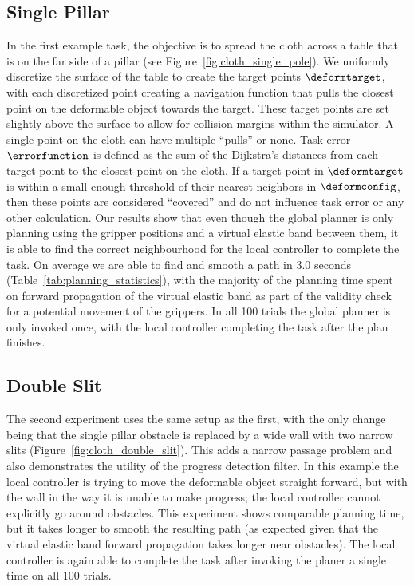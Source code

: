 \subsection{Single Pillar}
\label{sec:single_pillar}









In the first example task, the objective is to spread the cloth across a table that is on the far side  of a pillar (see Figure~\ref{fig:cloth_single_pole}). We uniformly discretize the surface of the table to create the target points $\deformtarget$, with each discretized point creating a navigation function that pulls the closest point on the deformable object towards the target. These target points are set slightly above the surface to allow for collision margins within the simulator. A single point on the cloth can have multiple ``pulls'' or none. Task error $\errorfunction$ is defined as the sum of the Dijkstra's distances from each target point to the closest point on the cloth. If a target point in $\deformtarget$ is within a small-enough threshold of their nearest neighbors in $\deformconfig$, then these points are considered ``covered'' and do not influence task error or any other calculation. Our results show that even though the global planner is only planning using the gripper positions and a virtual elastic band between them, it is able to find the correct neighbourhood for the local controller to complete the task. On average we are able to find and smooth a path in 3.0 seconds (Table~\ref{tab:planning_statistics}), with the majority of the planning time spent on forward propagation of the virtual elastic band as part of the validity check for a potential movement of the grippers. In all 100 trials the global planner is only invoked once, with the local controller completing the task after the plan finishes.









\subsection{Double Slit}


The second experiment uses the same setup as the first, with the only change being that the single pillar obstacle is replaced by a wide wall with two narrow slits (Figure~\ref{fig:cloth_double_slit}). This adds a narrow passage problem and also demonstrates the utility of the progress detection filter. In this example the local controller is trying to move the deformable object straight forward, but with the wall in the way it is unable to make progress; the local controller cannot explicitly go around obstacles. This experiment shows comparable planning time, but it takes longer to smooth the resulting path (as expected given that the virtual elastic band forward propagation takes longer near obstacles). The local controller is again able to complete the task after invoking the planer a single time on all 100 trials.



